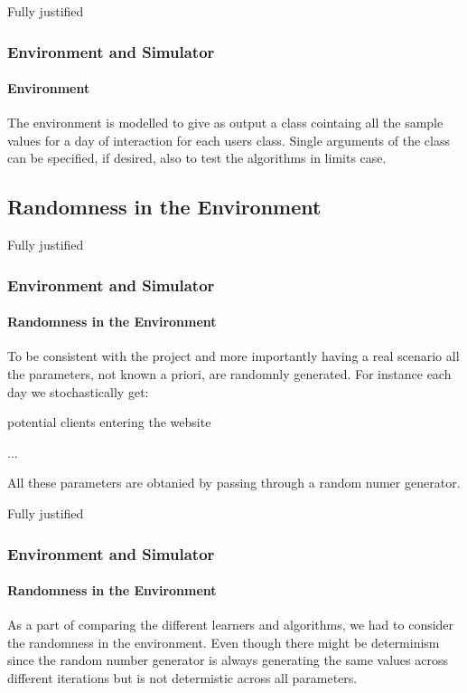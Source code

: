 \documentclass{beamer}
\begin{document}
\begin{frame}{Fully justified}

\frametitle{Environment and Simulator}
\framesubtitle{Environment}

The environment is modelled to give as output a class cointaing all the sample values for a day of interaction for each users class.
Single arguments of the class can be specified, if desired, also to test the algorithms in limits case.

\end{frame}


\subsection{Randomness in the Environment}

\begin {frame} {Fully justified}

\frametitle{Environment and Simulator}
\framesubtitle{Randomness in the Environment}

To be consistent with the project and more importantly having a real scenario all the parameters, not known a priori, are randomnly generated.
For instance each day we stochastically get:

\vspace{0.5cm}
\begin{list}{-}{\setlength{\itemsep}{0.3cm}}
    \item potential clients entering the website
    \item ...
\end{list}
\vspace{0.5cm}

All these parameters are obtanied by passing through a random numer generator.


\end {frame}


\begin{frame}{Fully justified}

\frametitle{Environment and Simulator}
\framesubtitle{Randomness in the Environment}

As a part of comparing the different learners and algorithms, we had to consider the randomness in the environment.
Even though there might be determinism since the random number generator is always generating the same values across different iterations but is not determistic across all parameters.

\end {frame}
\end{document}
